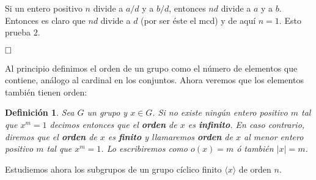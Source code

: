 \documentclass[12pt]{article}
\newtheorem{definition}[theorem]{Definición}
\begin{document}
Si un entero positivo $n$ divide a $a/d$ y a $b/d$, entonces $nd$ divide a $a$ y a $b$. Entonces es claro que $nd$ divide a $d$ (por ser éste el mcd) y de aquí $n=1$. Esto prueba $2.$

$\hfill \square$

Al principio definimos el orden de un grupo como el número de elementos que contiene, análogo al cardinal en los conjuntos. Ahora veremos que los elementos también tienen orden:

\begin{definition}Sea $G$ un grupo y $x \in G$. Si no existe ningún entero positivo $m$ tal que $x^m=1$ decimos entonces que el \textbf{orden} de $x$ es \textbf{infinito}. En caso contrario, diremos que el \textbf{orden} de $x$ es \textbf{finito} y llamaremos \textbf{orden} de $x$ al menor entero positivo $m$ tal que $x^m =1$. Lo escribiremos como $o(x) = m$ ó también $|x| = m$.
\end{definition}

Estudiemos ahora los subgrupos de un grupo cíclico finito $\langle x \rangle$ de orden $n$.
\end{document}
